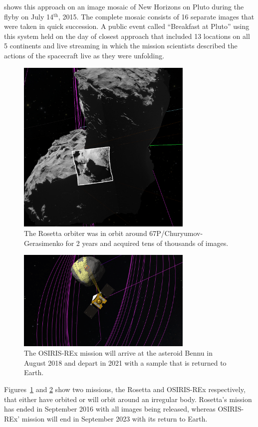  shows this approach on an image mosaic of New Horizons on Pluto during the flyby on July 14$^{\textrm{th}}$, 2015.  The complete mosaic consists of 16 separate images that were taken in quick succession.  A public event called ``Breakfast at Pluto'' using this system held on the day of closest approach that included 13 locations on all 5 continents and live streaming in which the mission scientists described the actions of the spacecraft live as they were unfolding.

\begin{figure}
\centering
\includegraphics[width=0.75\textwidth]{figures/contributions/sc/rosetta.jpg}
\caption{The Rosetta orbiter was in orbit around 67P/Churyumov-Gerasimenko for 2 years and acquired tens of thousands of images.}
\label{contributions:astro:sc:rosetta}
\end{figure}

\begin{figure}
\centering
\includegraphics[width=0.75\textwidth]{figures/contributions/sc/osiris_rex.png}
\caption{The OSIRIS-REx mission will arrive at the asteroid Bennu in August 2018 and depart in 2021 with a sample that is returned to Earth.}
\label{contributions:astro:sc:osirisrex}
\end{figure}

Figures~\ref{contributions:astro:sc:rosetta} and \ref{contributions:astro:sc:osirisrex} show two missions, the Rosetta and OSIRIS-REx respectively, that either have orbited or will orbit around an irregular body.  Rosetta's mission has ended in September 2016 with all images being released, whereas OSIRIS-REx' mission will end in September 2023 with its return to Earth.
